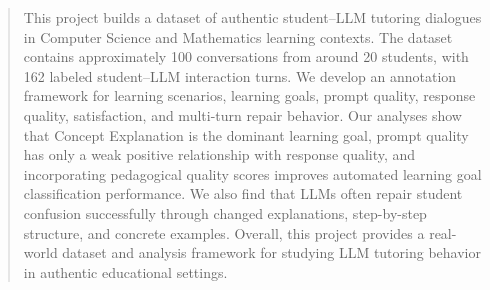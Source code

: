 \lstset{
    basicstyle=\ttfamily\tiny,
    breaklines=true,
    frame=single,
    columns=fullflexible,
    keepspaces=true
}

\setlength{\columnsep}{0.28in}
\setlength{\parindent}{1em}
\setlength{\parskip}{0pt}

\setlength{\textfloatsep}{4pt plus 1pt minus 1pt}
\setlength{\dbltextfloatsep}{4pt plus 1pt minus 1pt}
\renewcommand{\textfraction}{0.05}
\renewcommand{\topfraction}{0.95}
\renewcommand{\dbltopfraction}{0.95}
\renewcommand{\floatpagefraction}{0.75}
\renewcommand{\dblfloatpagefraction}{0.75}


\makeatletter
\renewcommand{\maketitle}{%
}
\makeatother


\raggedbottom

\maketitle

\begin{abstract}
This project builds a dataset of authentic student--LLM tutoring dialogues in Computer Science and Mathematics learning contexts. The dataset contains approximately 100 conversations from around 20 students, with 162 labeled student--LLM interaction turns. We develop an annotation framework for learning scenarios, learning goals, prompt quality, response quality, satisfaction, and multi-turn repair behavior. Our analyses show that Concept Explanation is the dominant learning goal, prompt quality has only a weak positive relationship with response quality, and incorporating pedagogical quality scores improves automated learning goal classification performance. We also find that LLMs often repair student confusion successfully through changed explanations, step-by-step structure, and concrete examples. Overall, this project provides a real-world dataset and analysis framework for studying LLM tutoring behavior in authentic educational settings.
\end{abstract}


